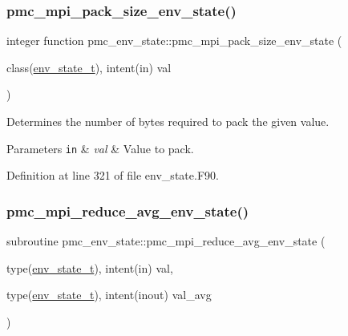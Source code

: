 \subsubsection{\texorpdfstring{pmc\+\_\+mpi\+\_\+pack\+\_\+size\+\_\+env\+\_\+state()}{pmc\_mpi\_pack\_size\_env\_state()}}
{\footnotesize\ttfamily integer function pmc\+\_\+env\+\_\+state\+::pmc\+\_\+mpi\+\_\+pack\+\_\+size\+\_\+env\+\_\+state (\begin{DoxyParamCaption}\item[{class(\mbox{\hyperlink{structpmc__env__state_1_1env__state__t}{env\+\_\+state\+\_\+t}}), intent(in)}]{val }\end{DoxyParamCaption})}



Determines the number of bytes required to pack the given value. 


\begin{DoxyParams}[1]{Parameters}
\mbox{\tt in}  & {\em val} & Value to pack. \\
\hline
\end{DoxyParams}


Definition at line 321 of file env\+\_\+state.\+F90.

\mbox{\label{namespacepmc__env__state_a4c7aa1ae763cf16b0380f1bcaaa4bff5}} 
\subsubsection{\texorpdfstring{pmc\+\_\+mpi\+\_\+reduce\+\_\+avg\+\_\+env\+\_\+state()}{pmc\_mpi\_reduce\_avg\_env\_state()}}
{\footnotesize\ttfamily subroutine pmc\+\_\+env\+\_\+state\+::pmc\+\_\+mpi\+\_\+reduce\+\_\+avg\+\_\+env\+\_\+state (\begin{DoxyParamCaption}\item[{type(\mbox{\hyperlink{structpmc__env__state_1_1env__state__t}{env\+\_\+state\+\_\+t}}), intent(in)}]{val,  }\item[{type(\mbox{\hyperlink{structpmc__env__state_1_1env__state__t}{env\+\_\+state\+\_\+t}}), intent(inout)}]{val\+\_\+avg }\end{DoxyParamCaption})}



